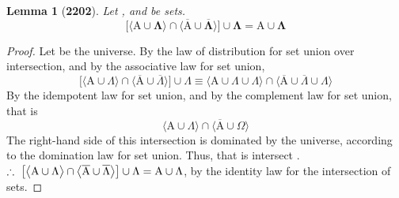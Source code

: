 \documentclass[preview]{standalone}
\newtheorem*{lemma*}{Lemma}
\begin{document}
\begin{lemma*}[\textbf{2202}] \color{black}
    Let , and \bm{$\Lambda$} be sets.
    \begin{equation*}
        \bm{
            \bigg[
                \Big \langle \mathrm{A} \cup \Lambda \Big \rangle
                    \cap
                \Big \langle 
                    \overline{\mathrm{A}} 
                        \cup 
                    \overline{\Lambda} 
                \Big \rangle
            \bigg]
                \cup
            \Lambda
                =
            \mathrm{A} \cup \Lambda
        }
    \end{equation*}
\end{lemma*}
\begin{proof} \color{black}
    Let \bm{$\Omega$} be the universe.
    By the law of distribution for set union over intersection,
    and by the associative law for set union,
    \begin{equation*}
        \bigg[
            \Big \langle \mathrm{A} \cup \Lambda \Big \rangle
                \cap
            \Big \langle 
                \overline{\mathrm{A}} 
                    \cup 
                \overline{\Lambda} 
            \Big \rangle
        \Big]
            \cup
        \Lambda
            \equiv
        \Big \langle \mathrm{A} \cup \Lambda \cup \Lambda \Big \rangle
            \cap
        \Big \langle 
            \overline{\mathrm{A}} 
                \cup 
            \overline{\Lambda} 
                \cup
            \Lambda
        \Big \rangle
    \end{equation*}
    By the idempotent law for set union, 
    and by the complement law for set union, that is
    \begin{equation*}
        \Big \langle \mathrm{A} \cup \Lambda \Big \rangle
            \cap
        \Big \langle 
            \overline{\mathrm{A}} 
                \cup 
            \Omega
        \Big \rangle
    \end{equation*}
    The right-hand side of this intersection is dominated by the universe,
    according to the domination law for set union. Thus, that is
     intersect \bm{$\Omega$}.
    $\therefore \text{\space} \relax{
    \big[
        \big \langle \mathrm{A} \cup \Lambda \big \rangle
            \cap
        \big \langle 
            \overline{\mathrm{A}} 
                \cup 
            \overline{\Lambda} 
        \big \rangle
    \big]
        \cup
    \Lambda
        =
    \mathrm{A} \cup \Lambda
    }$, by the identity law for the intersection of sets.
\color{lightgray} \end{proof}
\end{document}
